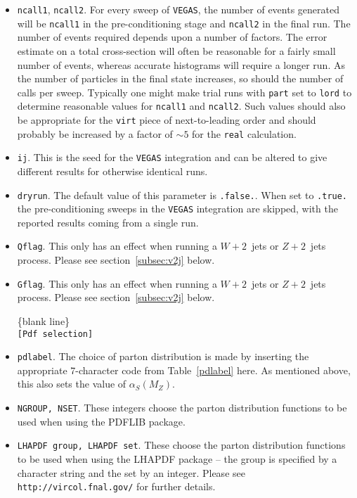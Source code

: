 \documentclass[12pt]{article}
\begin{document}
\begin{itemize}
\item {\tt ncall1}, {\tt ncall2}. For every sweep of {\tt VEGAS},
the number of events generated will be {\tt ncall1} in the
pre-conditioning stage and {\tt ncall2} in the final run. The number
of events required depends upon a number of factors. The error
estimate on a total cross-section will often be reasonable for a
fairly small number of events, whereas accurate histograms will
require a longer run. As the number of particles in the final state
increases, so should the number of calls per sweep. Typically one
might make trial runs with {\tt part} set to {\tt lord} to determine
reasonable values for {\tt ncall1} and {\tt ncall2}. Such values
should also be appropriate for the {\tt virt} piece of
next-to-leading order and should probably be increased by a factor of
$\sim 5$ for the {\tt real} calculation.

\item {\tt ij}. This is the seed for the {\tt VEGAS} integration
and can be altered to give different results for otherwise identical
runs.

\item {\tt dryrun}. The default value of this parameter is
{\tt .false.}. When set to {\tt .true.} the pre-conditioning sweeps
in the {\tt VEGAS} integration are skipped, with the reported
results coming from a single run.
\item {\tt Qflag}. This only has an effect when running a
$W+2$~jets or $Z+2$~jets process. Please see section~\ref{subsec:v2j}
below.

\item {\tt Gflag}. This only has an effect when running a
$W+2$~jets or $Z+2$~jets process. Please see section~\ref{subsec:v2j}
below.

\begin{center}
\{blank line\} \\
{\tt [Pdf selection] }
\end{center}

\item {\tt pdlabel}. The choice of parton distribution is made by
inserting the appropriate 7-character code from Table~{\ref{pdlabel}}
here. As mentioned above, this also sets the value of $\alpha_S(M_Z)$.

\item {\tt NGROUP, NSET}. These integers choose the parton distribution
functions to be used when using the PDFLIB package.
\item {\tt LHAPDF group, LHAPDF set}. These choose the parton
distribution functions to be used when using the LHAPDF package --
the group is specified by a character string and the set by an integer.
Please see {\tt http://vircol.fnal.gov/} for further details.


\end{itemize}
\end{document}

